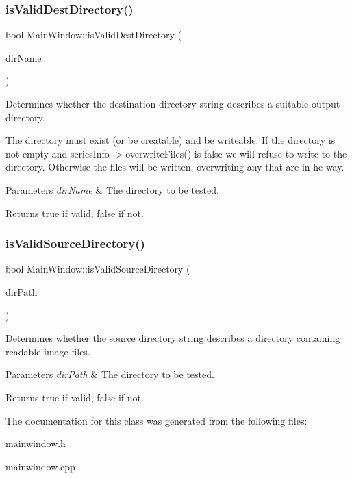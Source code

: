 \subsubsection{\texorpdfstring{is\+Valid\+Dest\+Directory()}{isValidDestDirectory()}}
{\footnotesize\ttfamily bool Main\+Window\+::is\+Valid\+Dest\+Directory (\begin{DoxyParamCaption}\item[{const Q\+String \&}]{dir\+Name }\end{DoxyParamCaption})}



Determines whether the destination directory string describes a suitable output directory. 

The directory must exist (or be creatable) and be writeable. If the directory is not empty and series\+Info-\/$>$overwrite\+Files() is false we will refuse to write to the directory. Otherwise the files will be written, overwriting any that are in he way. 
\begin{DoxyParams}{Parameters}
{\em dir\+Name} & The directory to be tested. \\
\hline
\end{DoxyParams}
\begin{DoxyReturn}{Returns}
true if valid, false if not. 
\end{DoxyReturn}
\mbox{\label{class_main_window_a9c938dcc890c7a6d8f8df98877b1acec}} 
\subsubsection{\texorpdfstring{is\+Valid\+Source\+Directory()}{isValidSourceDirectory()}}
{\footnotesize\ttfamily bool Main\+Window\+::is\+Valid\+Source\+Directory (\begin{DoxyParamCaption}\item[{const Q\+String \&}]{dir\+Path }\end{DoxyParamCaption})}



Determines whether the source directory string describes a directory containing readable image files. 


\begin{DoxyParams}{Parameters}
{\em dir\+Path} & The directory to be tested. \\
\hline
\end{DoxyParams}
\begin{DoxyReturn}{Returns}
true if valid, false if not. 
\end{DoxyReturn}


The documentation for this class was generated from the following files\+:\begin{DoxyCompactItemize}
\item 
mainwindow.\+h\item 
mainwindow.\+cpp\end{DoxyCompactItemize}
